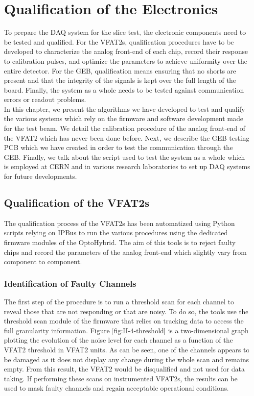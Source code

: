 \chapter{Qualification of the Electronics}
\label{chap:II-4-qualification}

  To prepare the DAQ system for the slice test, the electronic components need to be tested and qualified. For the VFAT2s, qualification procedures have to be developed to characterize the analog front-end of each chip, record their response to calibration pulses, and optimize the parameters to achieve uniformity over the entire detector. For the GEB, qualification means ensuring that no shorts are present and that the integrity of the signals is kept over the full length of the board. Finally, the system as a whole needs to be tested against communication errors or readout problems. \\

  In this chapter, we present the algorithms we have developed to test and qualify the various systems which rely on the firmware and software development made for the test beam. We detail the calibration procedure of the analog front-end of the VFAT2 which has never been done before. Next, we describe the GEB testing PCB which we have created in order to test the communication through the GEB. Finally, we talk about the script used to test the system as a whole which is employed at CERN and in various research laboratories to set up DAQ systems for future developments.

  \section{Qualification of the VFAT2s}

    The qualification process of the VFAT2s has been automatized using Python scripts relying on IPBus to run the various procedures using the dedicated firmware modules of the OptoHybrid. The aim of this tools is to reject faulty chips and record the parameters of the analog front-end which slightly vary from component to component.

    \subsection{Identification of Faulty Channels}

      The first step of the procedure is to run a threshold scan for each channel to reveal those that are not responding or that are noisy. To do so, the tools use the threshold scan module of the firmware that relies on tracking data to access the full granularity information. Figure \ref{fig:II-4-threshold} is a two-dimensional graph plotting the evolution of the noise level for each channel as a function of the VFAT2 threshold in VFAT2 units. As can be seen, one of the channels appears to be damaged as it does not display any change during the whole scan and remains empty. From this result, the VFAT2 would be disqualified and not used for data taking. If performing these scans on instrumented VFAT2s, the results can be used to mask faulty channels and regain acceptable operational conditions.

